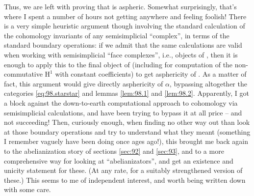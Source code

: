 Thus, we are left with proving that \Simplexf{} is aspheric. Somewhat
surprisingly, that's where I spent a number of hours not getting
anywhere and feeling foolish! There is a very simple heuristic
argument though involving the standard calculation of the cohomology
invariants of any semisimplicial ``complex'', in terms of the standard
boundary operations: if we admit that the same calculations are valid
when working with semisimplicial ``face complexes'', i.e., objects of
\Simplexfhat, then it is enough to apply this to the final object of
\Simplexfhat{} (including for computation of the non-commutative
$\mathrm H^1$ with constant coefficients) to get asphericity of
\Simplexf. As a matter of fact, this argument would give directly
asphericity of $\alpha$, bypassing altogether the categories
\eqref{eq:98.starstar} and lemmas \ref{lem:98.1} and \ref{lem:98.2}.
Apparently, I got a block against the down-to-earth computational
approach to cohomology via semisimplicial calculations, and have been
trying to bypass it at all price -- and not succeeding! Then,
curiously enough, when finding no other way out than look at those
boundary operations and try to understand what they meant (something I
remember vaguely have been doing once ages ago!), this brought me back
again to the abelianization story of sections \ref{sec:92} and
\ref{sec:93}, and to a more comprehensive way for looking at
``abelianizators'', and get an existence and unicity statement for
these. (At any rate, for a suitably strengthened version of these.)
This seems to me of independent interest, and worth being written down
with some care.

